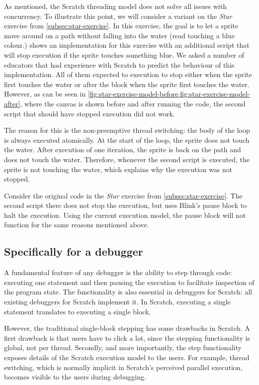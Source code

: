 \documentclass[../main]{subfiles}
\begin{document}
As \textcite{maloneyScratchProgrammingLanguage2010a} mentioned, the Scratch threading model does not solve all issues with concurrency.
To illustrate this point, we will consider a variant on the \emph{Star} exercise from \cref{subsec:star-exercise}.
In this exercise, the goal is to let a sprite move around on a path without falling into the water (read touching a blue colour.)
 shows an implementation for this exercise with an additional script that will stop execution if the sprite touches something blue.
We asked a number of educators that had experience with Scratch to predict the behaviour of this implementation.
All of them expected to execution to stop either when the sprite first touches the water or after the block when the sprite first touches the water.
However, as can be seen in \cref{fig:star-exercise-model-before,fig:star-exercise-model-after}, where the canvas is shown before and after running the code, the second script that should have stopped execution did not work.

The reason for this is the non-preemptive thread switching: the body of the loop is always executed atomically.
At the start of the loop, the sprite does not touch the water.
After execution of one iteration, the sprite is back on the path and does not touch the water.
Therefore, whenever the second script is executed, the sprite is not touching the water, which explains why the execution was not stopped.

Consider the original code in the \emph{Star} exercise from \cref{subsec:star-exercise}.
The second script there does not stop the execution, but uses Blink's pause block to halt the execution.
Using the current execution model, the pause block will not function for the same reasons mentioned above.

\subsection{Specifically for a debugger}\label{subsec:specifically-for-a-debugger}

A fundamental feature of any debugger is the ability to step through code: executing one statement and then pausing the execution to facilitate inspection of the program state.
The functionality is also essential in debuggers for Scratch: all existing debuggers for Scratch implement it.
In Scratch, executing a single statement translates to executing a single block.

However, the traditional single-block stepping has some drawbacks in Scratch.
A first drawback is that users have to click a lot, since the stepping functionality is global, not per thread.
Secondly, and more importantly, the step functionality exposes details of the Scratch execution model to the users.
For example, thread switching, which is normally implicit in Scratch's perceived parallel execution, becomes visible to the users during debugging.
\end{document}
